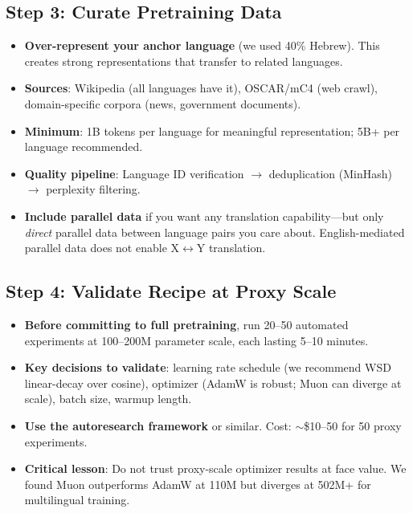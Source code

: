 \documentclass[10pt,twocolumn]{article}
\begin{document}
\subsection{Step 3: Curate Pretraining Data}

\begin{itemize}
    \item \textbf{Over-represent your anchor language} (we used 40\% Hebrew). This creates strong representations that transfer to related languages.
    \item \textbf{Sources}: Wikipedia (all languages have it), OSCAR/mC4 (web crawl), domain-specific corpora (news, government documents).
    \item \textbf{Minimum}: 1B tokens per language for meaningful representation; 5B+ per language recommended.
    \item \textbf{Quality pipeline}: Language ID verification $\rightarrow$ deduplication (MinHash) $\rightarrow$ perplexity filtering.
    \item \textbf{Include parallel data} if you want any translation capability---but only \emph{direct} parallel data between language pairs you care about. English-mediated parallel data does not enable X$\leftrightarrow$Y translation.
\end{itemize}

\subsection{Step 4: Validate Recipe at Proxy Scale}

\begin{itemize}
    \item \textbf{Before committing to full pretraining}, run 20--50 automated experiments at 100--200M parameter scale, each lasting 5--10 minutes.
    \item \textbf{Key decisions to validate}: learning rate schedule (we recommend WSD linear-decay over cosine), optimizer (AdamW is robust; Muon can diverge at scale), batch size, warmup length.
    \item \textbf{Use the autoresearch framework} \citep{karpathy2026autoresearch} or similar. Cost: $\sim$\$10--50 for 50 proxy experiments.
    \item \textbf{Critical lesson}: Do not trust proxy-scale optimizer results at face value. We found Muon outperforms AdamW at 110M but diverges at 502M+ for multilingual training.
\end{itemize}
\end{document}
